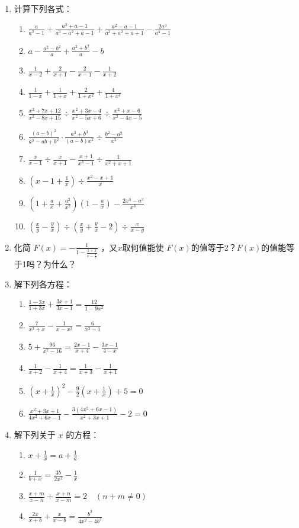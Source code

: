 \begin{enumerate}
\item 计算下列各式：
\begin{enumerate}
\item $\frac{a}{a^{2}-1}+\frac{a^{2}+ a-1}{a^{3}-a^{2}+a-1}+\frac{a^{2}-a-1}{a^{3}+a^{2}+a+1}-\frac{2 a^{3}}{a^{4}-1}$
\item  $a-\frac{a^{2}-b^{2}}{a}+\frac{a^{2}+b^{2}}{a}-b$
\item $\frac{1}{x-2}+\frac{2}{x+1}-\frac{2}{x-1}-\frac{1}{x+2}$
\item $\frac{1}{1-x}+\frac{1}{1+x}+\frac{2}{1+x^{2}}+\frac{4}{1+x^{4}}$
\item $\frac{x^{2}+7 x+12}{x^{2}-8 x+15} \div \frac{x^{2}+3 x-4}{x^{2}-5 x+6} \div \frac{x^{2}+x-6}{x^{2}-4 x-5}$
\item $\frac{(a-b)^{2}}{a^{2}-a b+b^{2}} \cdot \frac{a^{3}+b^{3}}{(a-b) x^{2}} \div \frac{b^{2}-a^{2}}{x^{2}}$
\item  $\frac{x}{x-1}\div\frac{x}{x+1}-\frac{x+1}{x^{3}-1} \div \frac{1}{x^{2}+x+1}$
\item $\left(x-1+\frac{1}{x}\right)\div \frac{x^{2}-x+1}{x}$
\item $\left(1+\frac{a}{x}+\frac{a^2}{x^2}\right)\left(1-\frac{a}{x}\right)-\frac{2x^3-a^3}{x^3}$
\item $\left(\frac{x}{y}-\frac{y}{x}\right)\div \left(\frac{x}{y}+\frac{y}{x}-2\right)\div \frac{x}{x-y}$
\end{enumerate}

\item 化简 $F(x)=-\frac{1}{1-\frac{1+x}{x-\frac{1}{x}}}$
，又$x$取何值能使 $F(x)$的值等于2？$F(x)$的值能等于1吗？为什么？
\item 解下列各方程：
\begin{enumerate}
\item $\frac{1-3 x}{1+3 x}+\frac{3 x+1}{3 x-1}=\frac{12}{1-9 x^{2}}$
\item $\frac{7}{x^{2}+x}-\frac{1}{x-x^{2}}=\frac{6}{x^{2}-1}$
\item $5+\frac{96}{x^{2}-16}=\frac{2 x-1}{x+4}-\frac{3 x-1}{4-x}$
\item $\frac{1}{x+2}-\frac{1}{x+4}=\frac{1}{x+3}-\frac{1}{x+1}$
\item $\left(x+\frac{1}{x}\right)^{2}-\frac{9}{2}\left(x+\frac{1}{x}\right)+5=0$
\item $\frac{x^{2}+3 x+1}{4 x^{2}+6 x-1}-\frac{3\left(4 x^{2}+6 x-1\right)}{x^{2}+3 x+1}-2=0$
\end{enumerate}

\item 解下列关于 $x$ 的方程：
\begin{enumerate}
    \item $x+\frac{1}{x}=a+\frac{1}{a}$ 
    \item $\frac{1}{b+x}=\frac{3b}{2x^2}-\frac{1}{x}$
    \item $\frac{x+m}{x-n}+\frac{x+n}{x-m}=2\quad (n+m\ne 0)$
    \item $\frac{2x}{x+b}+\frac{x}{x-b}=\frac{b^2}{4x^2-4b^2}$
\end{enumerate}


\end{enumerate}
